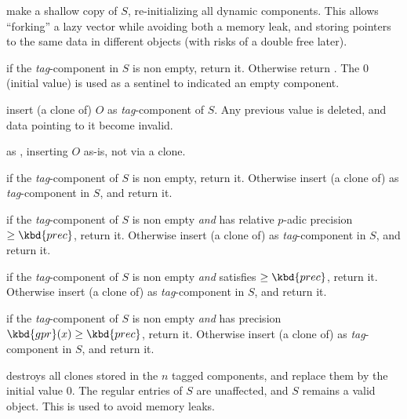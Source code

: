  make a shallow copy of $S$, re-initializing
all dynamic components. This allows ``forking'' a lazy vector while
avoiding both a memory leak, and storing pointers to the same data
in different objects (with risks of a double free later).

 if the \emph{tag}-component in $S$
is non empty, return it. Otherwise return . The  $0$
(initial value) is used as a sentinel to indicated an empty component.

 insert (a clone of) $O$
as \emph{tag}-component of $S$. Any previous value is deleted, and
data pointing to it become invalid.

 as ,
inserting $O$ as-is, not via a clone.

 if the
\emph{tag}-component of $S$ is non empty, return it. Otherwise insert
(a clone of)  as \emph{tag}-component in $S$, and return it.

if the \emph{tag}-component of $S$ is non empty \emph{and} has relative
$p$-adic precision $\geq \kbd{prec}$, return it. Otherwise insert (a clone
of)  as \emph{tag}-component in $S$, and return it.

 if the \emph{tag}-component of $S$ is non empty \emph{and}
satisfies  $\geq \kbd{prec}$, return it. Otherwise insert (a
clone of)  as \emph{tag}-component in $S$, and return it.

 if the \emph{tag}-component of $S$ is non empty
\emph{and} has precision $\kbd{gpr}(x)\geq \kbd{prec}$, return it. Otherwise
insert (a clone of)  as \emph{tag}-component in $S$,
and return it.

 destroys all clones stored in the $n$ tagged
components, and replace them by the initial value $0$. The regular entries of
$S$ are unaffected, and $S$ remains a valid object. This is used to
avoid memory leaks.
